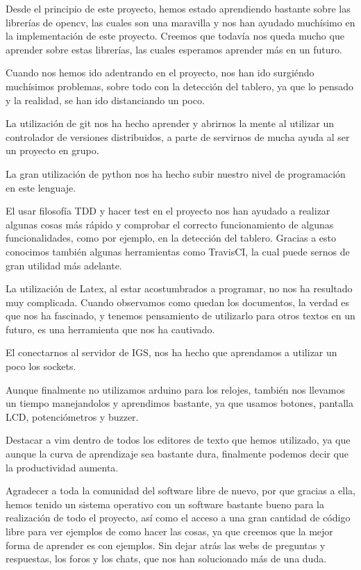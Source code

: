\documentclass[12pt,a4paper]{report}
\begin{document}
Desde el principio de este proyecto, hemos estado aprendiendo bastante sobre las
librerías de opencv, las cuales son una maravilla y nos han ayudado muchísimo en
la implementación de este proyecto. Creemos que todavía nos queda mucho que
aprender sobre estas librerías, las cuales esperamos aprender más en un futuro. 

Cuando nos hemos ido adentrando en el proyecto, nos han ido surgiéndo muchísimos
problemas, sobre todo con la detección del tablero, ya que lo pensado y la
realidad, se han ido distanciando un poco. 

La utilización de git nos ha hecho aprender y abrirnos la mente al utilizar un
controlador de versiones distribuidos, a parte de servirnos de mucha ayuda al
ser un proyecto en grupo. 

La gran utilización de python nos ha hecho subir nuestro nivel de programación
en este lenguaje.

El usar filosofía TDD y hacer test en el proyecto nos han ayudado a realizar
algunas cosas más rápido y comprobar el correcto funcionamiento de algunas
funcionalidades, como por ejemplo, en la detección del tablero. Gracias a esto
conocimos también algunas herramientas como TravisCI, la cual puede sernos de
gran utilidad más adelante. 

La utilización de Latex, al estar acostumbrados a programar, no nos ha resultado
muy complicada. Cuando observamos como quedan los documentos, la verdad es que
nos ha fascinado, y tenemos pensamiento de utilizarlo para otros textos en un
futuro, es una herramienta que nos ha cautivado.

El conectarnos al servidor de IGS, nos ha hecho que aprendamos a utilizar un
poco los sockets.

Aunque finalmente no utilizamos arduino para los relojes, también nos llevamos
un tiempo manejandolos y aprendimos bastante, ya que usamos botones, pantalla
LCD, potenciómetros y buzzer.

Destacar a vim dentro de todos los editores de texto que hemos utilizado, ya que
aunque la curva de aprendizaje sea bastante dura, finalmente podemos decir que
la productividad aumenta. 

Agradecer a toda la comunidad del software libre de nuevo, por que gracias a
ella, hemos tenido un sistema operativo con un software bastante bueno para la
realización de todo el proyecto, así como el acceso a una gran cantidad de
código libre para ver ejemplos de como hacer las cosas, ya que creemos que la
mejor forma de aprender es con ejemplos. Sin dejar atrás las webs de preguntas y
respuestas, los foros y los chats, que nos han solucionado más de una duda. 
\end{document}
